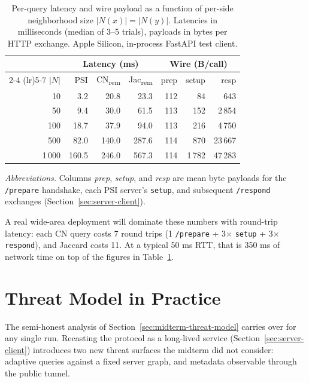 \documentclass[sigconf]{acmart}
\begin{document}
\begin{table}[t]
  \centering
  \small
  \caption{Per-query latency and wire payload as a function of per-side neighborhood size $|N(x)|=|N(y)|$. Latencies in milliseconds (median of 3--5 trials), payloads in bytes per HTTP exchange. Apple Silicon, in-process FastAPI test client.}
  \label{tab:perf}
  \begin{tabular}{r r r r r r r}
    \toprule
    & \multicolumn{3}{c}{Latency (ms)} & \multicolumn{3}{c}{Wire (B/call)} \\
    \cmidrule(lr){2-4} \cmidrule(lr){5-7}
    $|N|$ & PSI & CN\textsubscript{rem} & Jac\textsubscript{rem} & prep & setup & resp \\
    \midrule
    10    & 3.2   & 20.8  & 23.3   & 112 & 84    & 643    \\
    50    & 9.4   & 30.0  & 61.5   & 113 & 152   & 2\,854   \\
    100   & 18.7  & 37.9  & 94.0   & 113 & 216   & 4\,750   \\
    500   & 82.0  & 140.0 & 287.6  & 114 & 870   & 23\,667  \\
    1\,000 & 160.5 & 246.0 & 567.3  & 114 & 1\,782 & 47\,283  \\
    \bottomrule
  \end{tabular}
  {\footnotesize\setlength{\baselineskip}{10pt}%
    \vskip 3pt\par\noindent\emph{Abbreviations.}
    Columns \emph{prep}, \emph{setup}, and \emph{resp} are mean byte payloads for the \texttt{/prepare} handshake, each PSI server's \texttt{setup}, and subsequent \texttt{/respond} exchanges (Section~\ref{sec:server-client}).\par
  }
\end{table}

A real wide-area deployment will dominate these numbers with round-trip latency: each CN query costs 7 round trips (1 \texttt{/prepare} + 3$\times$ \texttt{setup} + 3$\times$ \texttt{respond}), and Jaccard costs 11. At a typical 50 ms RTT, that is 350 ms of network time on top of the figures in Table~\ref{tab:perf}.

\section{Threat Model in Practice}

The semi-honest analysis of Section~\ref{sec:midterm-threat-model} carries over for any single run. Recasting the protocol as a long-lived service (Section~\ref{sec:server-client}) introduces two new threat surfaces the midterm did not consider: adaptive queries against a fixed server graph, and metadata observable through the public tunnel.
\end{document}
